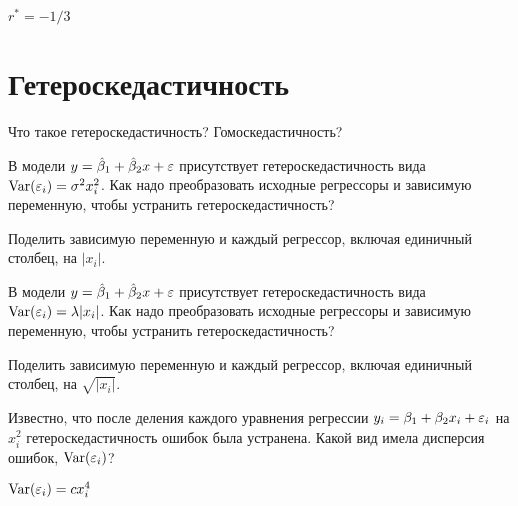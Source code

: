 \documentclass[pdftex,11pt,openany]{book}\usepackage[]{graphicx}\usepackage[]{color}
\begin{document}
\begin{solution}
$r^* = -1/3$
\end{solution}









\chapter{Гетероскедастичность}


\begin{problem}
Что такое гетероскедастичность? Гомоскедастичность?
\end{problem}
\begin{solution}
\end{solution}

\begin{problem}
В модели $y=\hat{\beta}_1+\hat{\beta}_2 x+\varepsilon$ присутствует гетероскедастичность вида $\operatorname{Var}(\varepsilon_i)=\sigma^2 x^2_i$. Как надо преобразовать исходные регрессоры и зависимую переменную, чтобы устранить гетероскедастичность? 
\end{problem}

\begin{solution}
Поделить зависимую переменную и каждый регрессор, включая единичный столбец, на $|x_i|$.
\end{solution}


\begin{problem}
В модели $y=\hat{\beta}_1+\hat{\beta}_2 x+\varepsilon$ присутствует гетероскедастичность вида $\operatorname{Var}(\varepsilon_i)=\lambda |x_i|$. Как надо преобразовать исходные регрессоры и зависимую переменную, чтобы устранить гетероскедастичность? 
\end{problem}

\begin{solution}
Поделить зависимую переменную и каждый регрессор, включая единичный столбец, на $\sqrt{|x_i|}$.
\end{solution}


\begin{problem}
Известно, что после деления каждого уравнения регрессии $y_i = \beta_1 + \beta_2 x_i + \varepsilon_i$ на $x_i^2$ гетероскедастичность ошибок была устранена. Какой вид имела дисперсия ошибок, $\operatorname{Var}(\varepsilon_i)$?
\end{problem}

\begin{solution}
$\operatorname{Var}(\varepsilon_i)=cx_i^4$
\end{solution}
\end{document}
